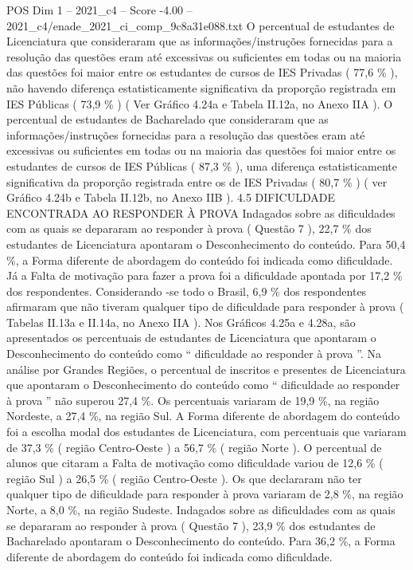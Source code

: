 \begin{textsample}{POS Dim 1 – 2021\_c4 – Score -4.00 – 2021\_c4/enade\_2021\_ci\_comp\_9c8a31e088.txt}
O percentual de estudantes de Licenciatura que consideraram que as informações/instruções fornecidas para a resolução das questões eram até excessivas ou suficientes em todas ou na maioria das questões foi maior entre os estudantes de cursos de IES Privadas ( 77,6 \% ), não havendo diferença estatisticamente significativa da proporção registrada em IES Públicas ( 73,9 \% ) ( Ver Gráfico 4.24a e Tabela II.12a, no Anexo IIA ).
O percentual de estudantes de Bacharelado que consideraram que as informações/instruções fornecidas para a resolução das questões eram até excessivas ou suficientes em todas ou na maioria das questões foi maior entre os estudantes de cursos de IES Públicas ( 87,3 \% ), uma diferença estatisticamente significativa da proporção registrada entre os de IES Privadas ( 80,7 \% ) ( ver Gráfico 4.24b e Tabela II.12b, no Anexo IIB ). 4.5 DIFICULDADE ENCONTRADA AO RESPONDER À PROVA Indagados sobre as dificuldades com as quais se depararam ao responder à prova ( Questão 7 ), 22,7 \% dos estudantes de Licenciatura apontaram o Desconhecimento do conteúdo.
Para 50,4 \%, a Forma diferente de abordagem do conteúdo foi indicada como dificuldade.
Já a Falta de motivação para fazer a prova foi a dificuldade apontada por 17,2 \% dos respondentes.
Considerando -se todo o Brasil, 6,9 \% dos respondentes afirmaram que não tiveram qualquer tipo de dificuldade para responder à prova ( Tabelas II.13a e II.14a, no Anexo IIA ).
Nos Gráficos 4.25a e 4.28a, são apresentados os percentuais de estudantes de Licenciatura que apontaram o Desconhecimento do conteúdo como “ dificuldade ao responder à prova ”.
Na análise por Grandes Regiões, o percentual de inscritos e presentes de Licenciatura que apontaram o Desconhecimento do conteúdo como “ dificuldade ao responder à prova ” não superou 27,4 \%.
Os percentuais variaram de 19,9 \%, na região Nordeste, a 27,4 \%, na região Sul.
A Forma diferente de abordagem do conteúdo foi a escolha modal dos estudantes de Licenciatura, com percentuais que variaram de 37,3 \% ( região Centro-Oeste ) a 56,7 \% ( região Norte ).
O percentual de alunos que citaram a Falta de motivação como dificuldade variou de 12,6 \% ( região Sul ) a 26,5 \% ( região Centro-Oeste ).
Os que declararam não ter qualquer tipo de dificuldade para responder à prova variaram de 2,8 \%, na região Norte, a 8,0 \%, na região Sudeste.
Indagados sobre as dificuldades com as quais se depararam ao responder à prova ( Questão 7 ), 23,9 \% dos estudantes de Bacharelado apontaram o Desconhecimento do conteúdo.
Para 36,2 \%, a Forma diferente de abordagem do conteúdo foi indicada como dificuldade.

\end{textsample}
